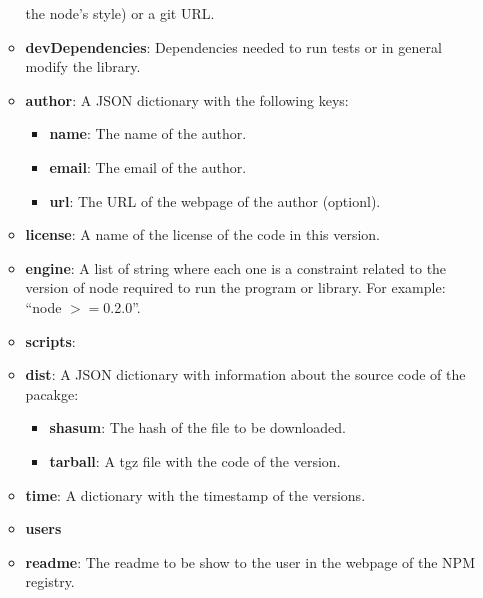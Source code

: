 \documentclass[letterpaper,12pt]{report}
\begin{document}
\begin{itemize}
\begin{itemize}
                the node's style) or a git URL.
            \item \textbf{devDependencies}: Dependencies needed to run tests or
                in general modify the library.
            \item \textbf{author}: A JSON dictionary with the following keys:
                \begin{itemize}
                    \item \textbf{name}: The name of the author.
                    \item \textbf{email}: The email of the author.
                    \item \textbf{url}: The URL of the webpage of the author
                        (optionl).
                \end{itemize}
            \item \textbf{license}: A name of the license of the code in this
                version.
            \item \textbf{engine}: A list of string where each one is a
                constraint related to the version of node required to run the
                program or library. For example: ``node $>=$0.2.0''.
            \item \textbf{scripts}:
            \item \textbf{dist}: A JSON dictionary with information about the
                source code of the pacakge:
                \begin{itemize}
                    \item \textbf{shasum}: The hash of the file to be
                        downloaded.
                    \item \textbf{tarball}: A tgz file with the code of the
                        version.
                \end{itemize}
            \item \textbf{time}: A dictionary with the timestamp of the
                versions.
            \item \textbf{users}
            \item \textbf{readme}: The readme to be show to the user in the
                webpage of the NPM registry.
        \end{itemize}
\end{itemize}
\end{document}
